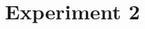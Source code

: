 \documentclass[11pt,fleqn]{article}
\newcommand{\6}{\mbox{$[\hspace*{-.6mm}[$}}
\newcommand{\9}{\mbox{$]\hspace*{-.6mm}]$}}
\newcommand{\citepos}[1]{\citeauthor{#1}'s \citeyear{#1}}
\begin{document}
%

\section{Experiment 2}\label{s3}
\end{document}
